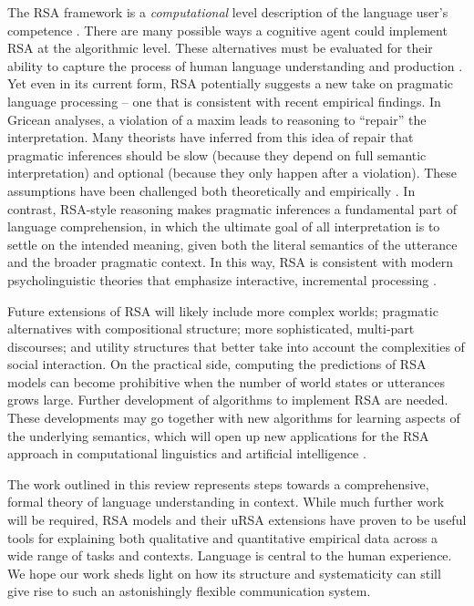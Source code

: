 \documentclass[]{elsarticle}
\begin{document}
The RSA framework is a \emph{computational} level description of the
language user's competence \citep{marr1982}. There are many
possible ways a cognitive agent could implement RSA at the algorithmic
level. These alternatives must be evaluated for their ability to capture
the process of human language understanding and production \citep{degen2015,nordmeyer2014}. Yet even in its
current form, RSA potentially suggests a new take on pragmatic language
processing -- one that is consistent with recent empirical
findings.
In Gricean analyses, a violation of a maxim leads to reasoning
to ``repair'' the interpretation. Many theorists have inferred from this
idea of repair that pragmatic inferences should be slow (because they
depend on full semantic interpretation) and optional (because they only
happen after a violation). These assumptions have been
challenged both theoretically and empirically \citep[e.g.,][]{levinson2000,grodner2010}. In contrast, RSA-style reasoning makes pragmatic inferences a fundamental part of language comprehension, in which the ultimate goal of all interpretation is to settle on the intended
meaning, given both the literal semantics of the utterance and the
broader pragmatic context. In this way, RSA is consistent with modern
psycholinguistic theories that emphasize interactive, incremental
processing \citep{degen2015}.


Future extensions of RSA will likely include more complex
worlds; pragmatic alternatives with compositional structure; more
sophisticated, multi-part discourses; and utility structures that better
take into account the complexities of social interaction.
On the practical side, computing the predictions of RSA models can
become prohibitive when the number of world states or utterances grows
large. Further development of algorithms to implement RSA are needed.
These
developments may go together with new algorithms for learning aspects of
the underlying semantics, which will open up new applications for the
RSA approach in computational linguistics and artificial intelligence \citep{golland2010,vogel2013b,monroe2015,andreas2016}.

The work outlined in this review represents steps towards a
comprehensive, formal theory of language understanding in context. While
much further work will be required, RSA models and their uRSA extensions have
proven to be useful tools for explaining both qualitative and
quantitative empirical data across a wide range of tasks and contexts.
Language is central to the human experience. We hope our work sheds
light on how its structure and systematicity can still give rise to such
an astonishingly flexible communication system.
\end{document}

